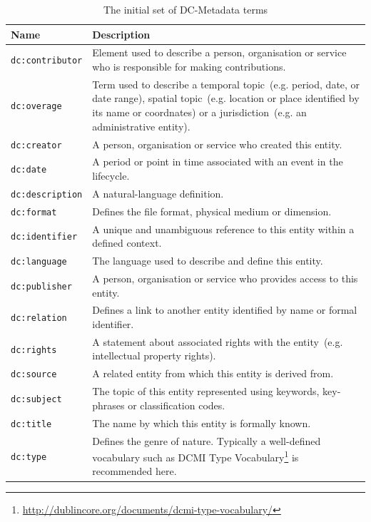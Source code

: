 \documentclass[draft,final]{vutinfth} %
\begin{document}
\begingroup
\renewcommand{\arraystretch}{2}
\begin{table}
	\begin{tabularx}{\textwidth}{l|X}
		\textbf{Name} & \textbf{Description} \\
		\hline
		\texttt{dc:contributor} & Element used to describe a person, organisation or service who is responsible for making contributions.\\
		\texttt{dc:overage} & Term used to describe a temporal topic~(e.g. period, date, or date range), spatial topic~(e.g. location or place identified by its name or coordnates) or a jurisdiction~(e.g. an administrative entity). \\
		\texttt{dc:creator} & A person, organisation or service who created this entity.\\
		\texttt{dc:date} & A period or point in time associated with an event in the lifecycle.\\
		\texttt{dc:description} & A natural-language definition.\\
		\texttt{dc:format} & Defines the file format, physical medium or dimension.\\
		\texttt{dc:identifier} & A unique and unambiguous reference to this entity within a defined context.\\
		\texttt{dc:language} & The language used to describe and define this entity.\\
		\texttt{dc:publisher} & A person, organisation or service who provides access to this entity.\\
		\texttt{dc:relation} & Defines a link to another entity identified by name or formal identifier.\\
		\texttt{dc:rights} & A statement about associated rights with the entity~(e.g. intellectual property rights).\\
		\texttt{dc:source} & A related entity from which this entity is derived from.\\
		\texttt{dc:subject} & The topic of this entity represented using keywords, key-phrases or classification codes.\\
		\texttt{dc:title} & The name by which this entity is formally known.\\
		\texttt{dc:type} & Defines the genre of nature. Typically a well-defined vocabulary such as DCMI Type Vocabulary\footnote{\url{http://dublincore.org/documents/dcmi-type-vocabulary/}} is recommended here.\\
	\end{tabularx}
	\caption{The initial set of DC-Metadata terms}
	\label{table:dublin_core}
\end{table}
\endgroup
\end{document}
